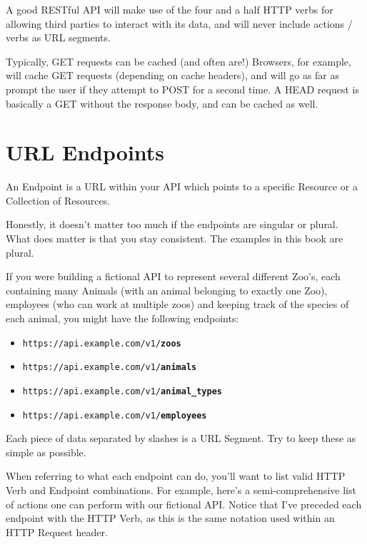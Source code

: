 \documentclass{book}
\begin{document}
A good RESTful API will make use of the four and a half HTTP verbs for allowing third parties to interact with its data, and will never include actions / verbs as URL segments.

Typically, GET requests can be cached (and often are!) Browsers, for example, will cache GET requests (depending on cache headers), and will go as far as prompt the user if they attempt to POST for a second time. A HEAD request is basically a GET without the response body, and can be cached as well.


\chapter{URL Endpoints}

An Endpoint is a URL within your API which points to a specific Resource or a Collection of Resources.

Honestly, it doesn't matter too much if the endpoints are singular or plural. What does matter is that you stay consistent. The examples in this book are plural.

If you were building a fictional API to represent several different Zoo's, each containing many Animals (with an animal belonging to exactly one Zoo), employees (who can work at multiple zoos) and keeping track of the species of each animal, you might have the following endpoints:

\begin{itemize}
\item \texttt{https://api.example.com/v1/\textbf{zoos}}
\item \texttt{https://api.example.com/v1/\textbf{animals}}
\item \texttt{https://api.example.com/v1/\textbf{animal\_types}}
\item \texttt{https://api.example.com/v1/\textbf{employees}}
\end{itemize}

Each piece of data separated by slashes is a URL Segment. Try to keep these as simple as possible.

When referring to what each endpoint can do, you'll want to list valid HTTP Verb and Endpoint combinations. For example, here's a semi-comprehensive list of actions one can perform with our fictional API. Notice that I've preceded each endpoint with the HTTP Verb, as this is the same notation used within an HTTP Request header.
\end{document}
